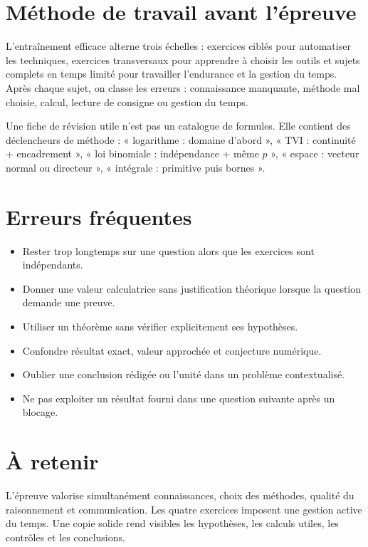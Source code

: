 \section{Méthode de travail avant l’épreuve}
L’entraînement efficace alterne trois échelles : exercices ciblés pour automatiser les techniques, exercices transversaux pour apprendre à choisir les outils et sujets complets en temps limité pour travailler l’endurance et la gestion du temps. Après chaque sujet, on classe les erreurs : connaissance manquante, méthode mal choisie, calcul, lecture de consigne ou gestion du temps.

Une fiche de révision utile n’est pas un catalogue de formules. Elle contient des déclencheurs de méthode : « logarithme : domaine d’abord », « TVI : continuité + encadrement », « loi binomiale : indépendance + même $p$ », « espace : vecteur normal ou directeur », « intégrale : primitive puis bornes ».

\section{Erreurs fréquentes}
\begin{itemize}
\item Rester trop longtemps sur une question alors que les exercices sont indépendants.
\item Donner une valeur calculatrice sans justification théorique lorsque la question demande une preuve.
\item Utiliser un théorème sans vérifier explicitement ses hypothèses.
\item Confondre résultat exact, valeur approchée et conjecture numérique.
\item Oublier une conclusion rédigée ou l’unité dans un problème contextualisé.
\item Ne pas exploiter un résultat fourni dans une question suivante après un blocage.
\end{itemize}

\section{À retenir}
\begin{aretenir}
L’épreuve valorise simultanément connaissances, choix des méthodes, qualité du raisonnement et communication. Les quatre exercices imposent une gestion active du temps. Une copie solide rend visibles les hypothèses, les calculs utiles, les contrôles et les conclusions.
\end{aretenir}
